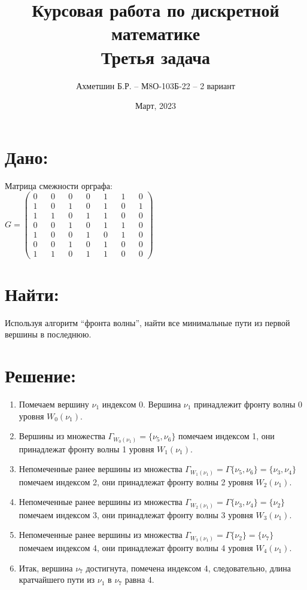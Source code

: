 \documentclass{article}
\title{Курсовая работа по дискретной математике\\Третья задача}
\author{Ахметшин Б.Р. -- М8О-103Б-22 -- 2 вариант}
\date{Март, 2023}
\begin{document}
\maketitle

\section*{Дано:}
Матрица смежности орграфа:\\

$
G = 
\begin{pmatrix}
0 && 0 && 0 && 0 && 1 && 1 && 0 \\
1 && 0 && 1 && 0 && 1 && 0 && 1 \\
1 && 1 && 0 && 1 && 1 && 0 && 0 \\
0 && 0 && 1 && 0 && 1 && 1 && 0 \\
1 && 0 && 0 && 1 && 0 && 1 && 0 \\
0 && 0 && 1 && 0 && 1 && 0 && 0 \\
1 && 1 && 0 && 1 && 1 && 0 && 0
\end{pmatrix}
$

\section*{Найти:}

Используя алгоритм “фронта волны”, найти все минимальные пути из первой вершины в последнюю.

\section*{Решение:}

\begin{enumerate}
  \item Помечаем вершину $\nu_1$ индексом 0. Вершина $\nu_1$ принадлежит фронту волны 0 уровня $W_{0}(\nu_1)$.
  \item Вершины из множества $\Gamma_{W_{0}(\nu_1)}=\{\nu_5, \nu_6\}$ помечаем индексом 1, они принадлежат фронту волны 1 уровня $W_{1}(\nu_1)$.
  \item Непомеченные ранее вершины из множества $\Gamma_{W_{1}(\nu_1)}=\Gamma\{\nu_5,\nu_6\}=\{\nu_3,\nu_4\}$ помечаем индексом 2, они принадлежат фронту волны 2 уровня $W_{2}(\nu_1)$.
  \item Непомеченные ранее вершины из множества $\Gamma_{W_{2}(\nu_1)}=\Gamma\{\nu_3,\nu_4\}=\{\nu_2\}$ помечаем индексом 3, они принадлежат фронту волны 3 уровня $W_{3}(\nu_1)$.
  \item Непомеченные ранее вершины из множества $\Gamma_{W_{3}(\nu_1)}=\Gamma\{\nu_2\}=\{\nu_7\}$ помечаем индексом 4, они принадлежат фронту волны 4 уровня $W_{4}(\nu_1)$.
  \item Итак, вершина $\nu_7$ достигнута, помечена индексом 4, следовательно, длина кратчайшего пути из $\nu_1$ в $\nu_7$ равна 4.
\end{enumerate}
\end{document}
